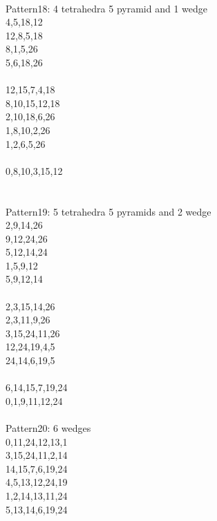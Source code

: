 \documentclass[twocolumn]{article}
\begin{document}
 \\
\tiny  Pattern18: 4 tetrahedra 5 pyramid and 1 wedge\\
\tiny  4,5,18,12\\
\tiny  12,8,5,18 \\
\tiny  8,1,5,26 \\
\tiny  5,6,18,26 \\
\tiny   \\
\tiny  12,15,7,4,18 \\
\tiny  8,10,15,12,18 \\
\tiny  2,10,18,6,26 \\
\tiny  1,8,10,2,26\\
\tiny  1,2,6,5,26\\
\tiny   \\
\tiny  0,8,10,3,15,12 \\
    \\

 \\
\tiny  Pattern19: 5 tetrahedra 5 pyramids and 2 wedge\\
\tiny 2,9,14,26       \\
\tiny 9,12,24,26      \\
\tiny 5,12,14,24      \\
\tiny 1,5,9,12        \\
\tiny 5,9,12,14       \\
\tiny   \\
\tiny 2,3,15,14,26    \\
\tiny 2,3,11,9,26     \\
\tiny 3,15,24,11,26   \\
\tiny 12,24,19,4,5    \\
\tiny 24,14,6,19,5    \\
\tiny   \\
\tiny 6,14,15,7,19,24 \\
\tiny 0,1,9,11,12,24  \\
                                                                                                                                                                                                


 \\
\tiny  Pattern20: 6 wedges\\
\tiny  0,11,24,12,13,1 \\
\tiny  3,15,24,11,2,14  \\
\tiny  14,15,7,6,19,24 \\
\tiny  4,5,13,12,24,19 \\
\tiny  1,2,14,13,11,24 \\
\tiny  5,13,14,6,19,24 \\
\tiny   \\
\end{document}
